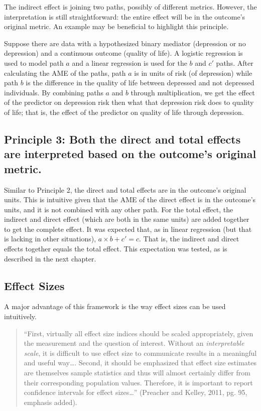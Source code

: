 \documentclass[]{DissertateUSU}
\begin{document}
The indirect effect is joining two paths, possibly of different metrics.
However, the interpretation is still straightforward: the entire effect
will be in the outcome's original metric. An example may be beneficial
to highlight this principle.

Suppose there are data with a hypothesized binary mediator (depression
or no depression) and a continuous outcome (quality of life). A logistic
regression is used to model path \(a\) and a linear regression is used
for the \(b\) and \(c'\) paths. After calculating the AME of the paths,
path \(a\) is in units of risk (of depression) while path \(b\) is the
difference in the quality of life between depressed and not depressed
individuals. By combining paths \(a\) and \(b\) through multiplication,
we get the effect of the predictor on depression risk then what that
depression risk does to quality of life; that is, the effect of the
predictor on quality of life through depression.

\subsection{Principle 3: Both the direct and total effects are
interpreted based on the outcome's original
metric.}\label{principle-3-both-the-direct-and-total-effects-are-interpreted-based-on-the-outcomes-original-metric.}

Similar to Principle 2, the direct and total effects are in the
outcome's original units. This is intuitive given that the AME of the
direct effect is in the outcome's units, and it is not combined with any
other path. For the total effect, the indirect and direct effect (which
are both in the same units) are added together to get the complete
effect. It was expected that, as in linear regression (but that is
lacking in other situations), \(a \times b + c'= c\). That is, the
indirect and direct effects together equals the total effect. This
expectation was tested, as is described in the next chapter.

\subsection{Effect Sizes}\label{effect-sizes}

A major advantage of this framework is the way effect sizes can be used
intuitively.

\begin{quote}
``First, virtually all effect size indices should be scaled
appropriately, given the measurement and the question of interest.
Without an \emph{interpretable scale}, it is difficult to use effect
size to communicate results in a meaningful and useful way\ldots{}.
Second, it should be emphasized that effect size estimates are
themselves sample statistics and thus will almost certainly differ from
their corresponding population values. Therefore, it is important to
report confidence intervals for effect sizes\ldots{}'' (Preacher and
Kelley, 2011, pg. 95, emphasis added).
\end{quote}
\end{document}
